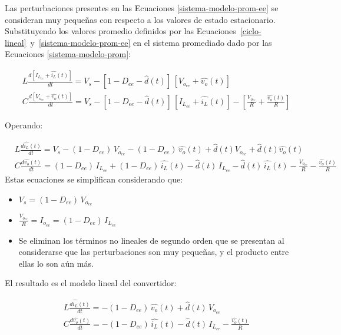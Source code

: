 Las perturbaciones presentes en las Ecuaciones \ref{sistema-modelo-prom-ee} se consideran muy pequeñas con respecto a los valores de estado estacionario. Substituyendo los valores promedio definidos por las Ecuaciones~\ref{ciclo-lineal}~y~\ref{sistema-modelo-prom-ee} en el sistema promediado dado por las Ecuaciones \ref{sistema-modelo-prom}:

\begin{equation}
  \begin{split}
    & L \frac{d \left[ I_{L_{ee}} + \hat{i_L}(t)\right]}{dt} = V_s - \left[ 1 - D_{ee} - \hat{d}(t) \right] \, \left[ V_{o_{ee}} + \hat{v_o}(t) \right]
    \\
    & C \frac{d \left[ V_{o_{ee}} + \hat{v_o}(t)\right]}{dt} = V_s - \left[ 1 - D_{ee} - \hat{d}(t) \right] \, \left[ I_{L_{ee}} + \hat{i_L}(t) \right] - \left[ \frac{V_{o_{ee}}}{R} + \frac{\hat{v_o}(t)}{R} \right]
  \end{split}
\end{equation}

Operando:

\begin{equation}
  \begin{split}
    & L \frac{d \hat{i_L}(t)}{dt} = V_s -  (1 - D_{ee}) \, V_{o_{ee}} - (1 - D_{ee}) \, \hat{v_o}(t) + \hat{d}(t) V_{o_{ee}} + \hat{d}(t) \hat{v_o}(t)
    \\
    & C \frac{d \hat{v_o}(t)}{dt} = (1 - D_{ee}) \, I_{L_{ee}} + (1 - D_{ee}) \, \hat{i_L}(t) - \hat{d}(t) \, I_{L_{ee}} - \hat{d}(t) \, \hat{i_L}(t) - \frac{V_{o_{ee}}}{R} - \frac{\hat{v_o}(t)}{R}
  \end{split}
\end{equation}
Estas ecuaciones se simplifican considerando que:

\begin{itemize}
  \item $V_s = (1-D_{ee}) \, V_{o_{ee}}$
  \item $\frac{V_{o_{ee}}}{R} = I_{o_{ee}} = (1-D_{ee}) \, I_{L_{ee}}$
  \item Se eliminan los términos no lineales de segundo orden que se presentan al considerarse que las perturbaciones son muy pequeñas, y el producto entre ellas lo son aún más.
\end{itemize}

El resultado es el modelo lineal del convertidor:

\begin{equation}
  \boxed{
  \begin{split}
  & L \frac{d\hat{i_L}(t)}{dt} = - (1-D_{ee}) \, \hat{v_o}(t) + \hat{d}(t) \, V_{o_{ee}}
  \\ 
  & C \frac{d\hat{v_o}(t)}{dt} = - (1-D_{ee}) \, \hat{i_L}(t) - \hat{d}(t) \, I_{L_{ee}} - \frac{\hat{v_o}(t)}{R}  
  \end{split}
  }
  \label{sistema-modelo-lineal}
\end{equation}

